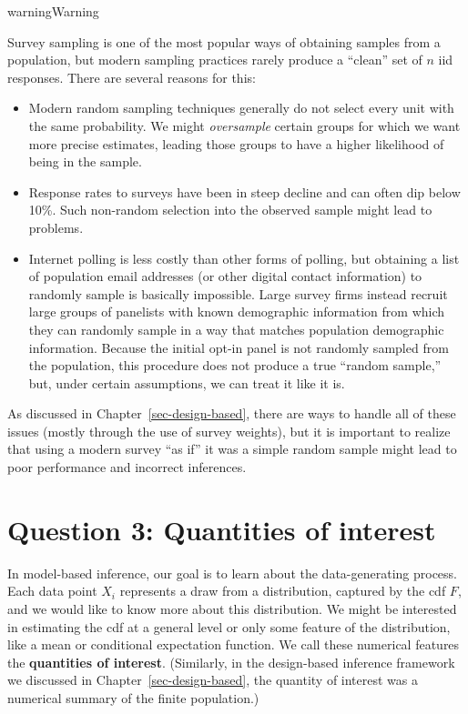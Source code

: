 \documentclass[
  13pt,
  letterpaper,
  DIV=11,
  numbers=noendperiod]{scrreprt}
\theoremstyle{plain}
\theoremstyle{plain}
\theoremstyle{definition}
\theoremstyle{definition}
\theoremstyle{remark}
\begin{document}
\begin{bookcallout}{warning}{Warning}

Survey sampling is one of the most popular ways of obtaining samples
from a population, but modern sampling practices rarely produce a
``clean'' set of \(n\) iid responses. There are several reasons for
this:

\begin{itemize}
\item
  Modern random sampling techniques generally do not select every unit
  with the same probability. We might \emph{oversample} certain groups
  for which we want more precise estimates, leading those groups to have
  a higher likelihood of being in the sample.
\item
  Response rates to surveys have been in steep decline and can often dip
  below 10\%. Such non-random selection into the observed sample might
  lead to problems.
\item
  Internet polling is less costly than other forms of polling, but
  obtaining a list of population email addresses (or other digital
  contact information) to randomly sample is basically impossible. Large
  survey firms instead recruit large groups of panelists with known
  demographic information from which they can randomly sample in a way
  that matches population demographic information. Because the initial
  opt-in panel is not randomly sampled from the population, this
  procedure does not produce a true ``random sample,'' but, under
  certain assumptions, we can treat it like it is.
\end{itemize}

As discussed in Chapter~\ref{sec-design-based}, there are ways to handle
all of these issues (mostly through the use of survey weights), but it
is important to realize that using a modern survey ``as if'' it was a
simple random sample might lead to poor performance and incorrect
inferences.

\end{bookcallout}

\section{Question 3: Quantities of
interest}\label{question-3-quantities-of-interest}

In model-based inference, our goal is to learn about the data-generating
process. Each data point \(X_i\) represents a draw from a distribution,
captured by the cdf \(F\), and we would like to know more about this
distribution. We might be interested in estimating the cdf at a general
level or only some feature of the distribution, like a mean or
conditional expectation function. We call these numerical features the
\textbf{quantities of interest}. (Similarly, in the design-based
inference framework we discussed in Chapter~\ref{sec-design-based}, the
quantity of interest was a numerical summary of the finite population.)
\end{document}
